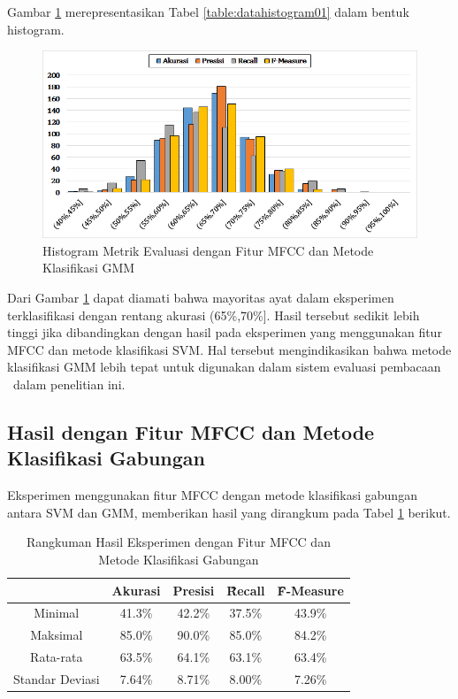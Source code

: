  Gambar \ref{fig:histogram01} merepresentasikan Tabel \ref{table:datahistogram01} dalam bentuk histogram.
  \begin{figure}
    \centering
    \includegraphics[width=\linewidth]{pics/histogram01}
    \caption{Histogram Metrik Evaluasi dengan Fitur MFCC dan Metode Klasifikasi GMM}
    \label{fig:histogram01}
  \end{figure}

  Dari Gambar \ref{fig:histogram01} dapat diamati bahwa mayoritas ayat dalam eksperimen terklasifikasi dengan rentang akurasi (65\%,70\%]. Hasil tersebut sedikit lebih tinggi jika dibandingkan dengan hasil pada eksperimen yang menggunakan fitur MFCC dan metode klasifikasi SVM. Hal tersebut mengindikasikan bahwa metode klasifikasi GMM lebih tepat untuk digunakan dalam sistem evaluasi pembacaan \quran~dalam penelitian ini.

  \subsection{Hasil dengan Fitur MFCC dan Metode Klasifikasi Gabungan}
  Eksperimen menggunakan fitur MFCC dengan metode klasifikasi gabungan antara SVM dan GMM, memberikan hasil yang dirangkum pada Tabel \ref{table:mfccgabungan} berikut.

  \begin{table}
    \centering
    \caption{Rangkuman Hasil Eksperimen dengan Fitur MFCC dan Metode Klasifikasi Gabungan}
    \begin{tabular}{|c|c|c|c|c|}
      \hline
       & Akurasi & Presisi & \f{\f{Recall}} & \f{\f{F-Measure}} \\ \hline
      Minimal         & 41.3\% & 42.2\% & 37.5\% & 43.9\% \\ \hline
      Maksimal        & 85.0\% & 90.0\% & 85.0\% & 84.2\% \\ \hline
      Rata-rata       & 63.5\% & 64.1\% & 63.1\% & 63.4\% \\ \hline
      Standar Deviasi & 7.64\% & 8.71\% & 8.00\% & 7.26\%  \\ \hline
    \end{tabular}
    \label{table:mfccgabungan}
  \end{table}

